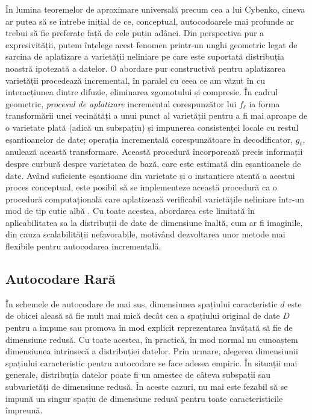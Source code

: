 \documentclass[../../book-main_ro.tex]{subfiles}
\begin{document}
În lumina teoremelor de aproximare universală precum cea a lui Cybenko, cineva
ar putea să se întrebe inițial de ce, conceptual, autocodoarele mai profunde ar trebui să fie preferate
față de cele puțin adânci.
Din perspectiva pur a expresivității, putem înțelege acest fenomen
printr-un unghi geometric legat de sarcina de aplatizare a varietății
neliniare pe care este suportată distribuția noastră ipotezată a datelor. O abordare pur
constructivă pentru aplatizarea varietății procedează incremental, în
paralel cu ceea ce am văzut în  cu
interacțiunea dintre difuzie, eliminarea zgomotului și compresie. În cadrul geometric,
\textit{procesul de aplatizare} incremental corespunzător lui $f_{\ell}$
ia forma transformării unei vecinătăți a unui punct al varietății pentru a fi
mai aproape de o varietate plată (adică un subspațiu) și impunerea consistenței locale
cu restul eșantioanelor de date; operația incrementală corespunzătoare în
decodificator, $g_{\ell}$, anulează această transformare. Această procedură încorporează precis
informații despre curbură despre varietatea de bază, care este
estimată din eșantioanele de date. Având suficiente eșantioane din varietate și
o instanțiere atentă a acestui proces conceptual, este posibil să se implementeze
această procedură ca o procedură computațională care aplatizează verificabil varietățile
neliniare într-un mod de tip cutie albă \cite{Psenka-JMLR24}. Cu toate acestea, abordarea este
limitată în aplicabilitatea sa la distribuții de date de dimensiune înaltă, cum ar fi
imaginile, din cauza scalabilității nefavorabile, motivând dezvoltarea unor metode
mai flexibile pentru autocodarea incrementală.

\subsection{Autocodare Rară}
În schemele de autocodare de mai sus, dimensiunea spațiului caracteristic
$d$ este de obicei aleasă să fie mult mai mică decât cea a spațiului original de date
$D$ pentru a impune sau promova în mod explicit reprezentarea învățată
să fie de dimensiune redusă. Cu toate acestea, în practică,
în mod normal nu cunoaștem dimensiunea intrinsecă a distribuției
datelor. Prin urmare, alegerea dimensiunii spațiului caracteristic pentru
autocodare se face adesea empiric. În situații mai generale,
distribuția datelor poate fi un amestec de câteva subspații
sau subvarietăți de dimensiune redusă. În aceste cazuri, nu mai este fezabil
să se impună un singur spațiu de dimensiune redusă pentru toate caracteristicile împreună.
\end{document}
